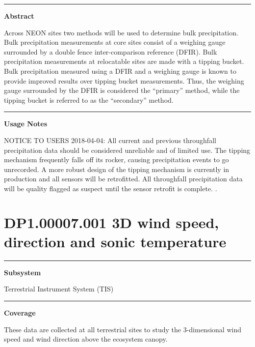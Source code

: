 \documentclass[]{article}
\begin{document}
\begin{center}\rule{0.5\linewidth}{\linethickness}\end{center}

\textbf{Abstract}

Across NEON sites two methods will be used to determine bulk
precipitation. Bulk precipitation measurements at core sites consist of
a weighing gauge surrounded by a double fence inter-comparison reference
(DFIR). Bulk precipitation measurements at relocatable sites are made
with a tipping bucket. Bulk precipitation measured using a DFIR and a
weighing gauge is known to provide improved results over tipping bucket
measurements. Thus, the weighing gauge surrounded by the DFIR is
considered the ``primary'' method, while the tipping bucket is referred
to as the ``secondary'' method.

\begin{center}\rule{0.5\linewidth}{\linethickness}\end{center}

\textbf{Usage Notes}

NOTICE TO USERS 2018-04-04: All current and previous throughfall
precipitation data should be considered unreliable and of limited use.
The tipping mechanism frequently falls off its rocker, causing
precipitation events to go unrecorded. A more robust design of the
tipping mechanism is currently in production and all sensors will be
retrofitted. All throughfall precipitation data will be quality flagged
as suspect until the sensor retrofit is complete. \newpage
.

\section{DP1.00007.001 3D wind speed, direction and sonic
temperature}\label{dp1.00007.001-3d-wind-speed-direction-and-sonic-temperature}

\begin{center}\rule{0.5\linewidth}{\linethickness}\end{center}

\textbf{Subsystem}

Terrestrial Instrument System (TIS)

\begin{center}\rule{0.5\linewidth}{\linethickness}\end{center}

\textbf{Coverage}

These data are collected at all terrestrial sites to study the
3-dimensional wind speed and wind direction above the ecosystem canopy.
\end{document}
